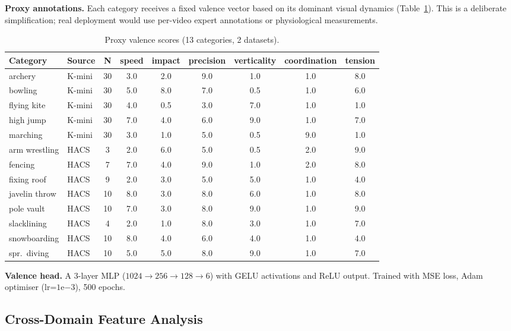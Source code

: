 \documentclass[11pt]{article}
\begin{document}
\textbf{Proxy annotations.} Each category receives a fixed valence vector based on its dominant visual dynamics (Table~\ref{tab:proxy}). This is a deliberate simplification; real deployment would use per-video expert annotations or physiological measurements.

\begin{table}[t]
\centering
\caption{Proxy valence scores (13 categories, 2 datasets).}
\label{tab:proxy}
\small
\begin{tabular}{llccccccc}
\toprule
\textbf{Category} & \textbf{Source} & \textbf{N} & \textbf{speed} & \textbf{impact} & \textbf{precision} & \textbf{verticality} & \textbf{coordination} & \textbf{tension} \\
\midrule
archery & K-mini & 30 & 3.0 & 2.0 & 9.0 & 1.0 & 1.0 & 8.0 \\
bowling & K-mini & 30 & 5.0 & 8.0 & 7.0 & 0.5 & 1.0 & 6.0 \\
flying kite & K-mini & 30 & 4.0 & 0.5 & 3.0 & 7.0 & 1.0 & 1.0 \\
high jump & K-mini & 30 & 7.0 & 4.0 & 6.0 & 9.0 & 1.0 & 7.0 \\
marching & K-mini & 30 & 3.0 & 1.0 & 5.0 & 0.5 & 9.0 & 1.0 \\
arm wrestling & HACS & 3 & 2.0 & 6.0 & 5.0 & 0.5 & 2.0 & 9.0 \\
fencing & HACS & 7 & 7.0 & 4.0 & 9.0 & 1.0 & 2.0 & 8.0 \\
fixing roof & HACS & 9 & 2.0 & 3.0 & 5.0 & 5.0 & 1.0 & 4.0 \\
javelin throw & HACS & 10 & 8.0 & 3.0 & 8.0 & 6.0 & 1.0 & 8.0 \\
pole vault & HACS & 10 & 7.0 & 3.0 & 8.0 & 9.0 & 1.0 & 9.0 \\
slacklining & HACS & 4 & 2.0 & 1.0 & 8.0 & 3.0 & 1.0 & 7.0 \\
snowboarding & HACS & 10 & 8.0 & 4.0 & 6.0 & 4.0 & 1.0 & 4.0 \\
spr.\ diving & HACS & 10 & 5.0 & 5.0 & 8.0 & 9.0 & 1.0 & 7.0 \\
\bottomrule
\end{tabular}
\end{table}

\textbf{Valence head.} A 3-layer MLP ($1024 \to 256 \to 128 \to 6$) with GELU activations and ReLU output. Trained with MSE loss, Adam optimiser (lr=$1\mathrm{e}{-3}$), 500 epochs.

\subsection{Cross-Domain Feature Analysis}
\end{document}
